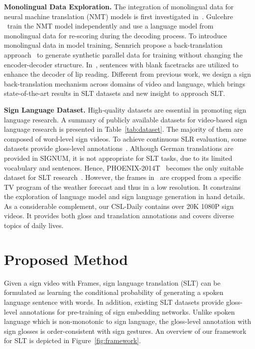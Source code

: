 \documentclass[final]{cvpr}
\begin{document}
\textbf{Monolingual Data Exploration.} 
The integration of monolingual data for neural machine translation (NMT) models is first investigated in~\cite{gulcehre2015using}. 
Gulcehre ~\etal train the NMT model independently and use a language model from monolingual data for re-scoring during the decoding process. 
To introduce monolingual data in model training, Sennrich \etal propose a back-translation approach~\cite{backtranslationACL16} to generate synthetic parallel data for training without changing the encoder-decoder structure. 
In~\cite{chung2017lip}, sentences with blank facetracks are utilized to enhance the decoder of lip reading. 
Different from previous work, we design a sign back-translation mechanism across domains of video and language, which brings state-of-the-art results in SLT datasets and new insight to approach SLT. 

\textbf{Sign Language Dataset.} 
High-quality datasets are essential in promoting sign language research. 
A summary of publicly available datasets for video-based sign language research is presented in Table~\ref{tab:dataset}. 
The majority of them are composed of word-level sign videos. 
To achieve continuous SLR evaluation, some datasets provide gloss-level annotations~\cite{huang18han,phoenix2014,signum07}. 
Although German translations are provided in SIGNUM, it is not appropriate for SLT tasks, due to its limited vocabulary and sentences. 
Hence, PHOENIX-2014T~\cite{slt-nslt-cihan18} becomes the only suitable dataset for SLT research~\cite{slt-trans-cihan20,tspnet-nips20}.  
However, the frames in~\cite{phoenix2014} are cropped from a specific TV program of the weather forecast and thus in a low resolution. 
It constrains the exploration of language model and sign language generation in hand details. 
As a considerable complement, 
our CSL-Daily contains over 20K 1080P sign videos. 
It provides both gloss and translation annotations and covers diverse topics of daily lives. 


\section{Proposed Method}
Given a sign video  with  Frames, 
sign language translation (SLT) can be formulated as learning the conditional probability  of generating a spoken language sentence  with  words. 
In addition, existing SLT datasets provide gloss-level annotations for pre-training of sign embedding networks.
Unlike spoken language which is non-monotonic to sign language,  
the gloss-level annotation  with  sign glosses is order-consistent with sign gestures. 
An overview of our framework for SLT is depicted in Figure~\ref{fig:framework}. 
\end{document}
